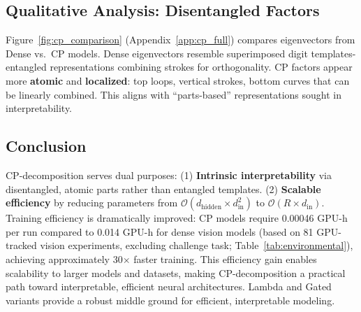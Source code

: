 \subsection{Qualitative Analysis: Disentangled Factors}

Figure~\ref{fig:cp_comparison} (Appendix~\ref{app:cp_full}) compares eigenvectors from Dense vs.\ CP models.
Dense eigenvectors resemble superimposed digit templates-entangled representations combining strokes for orthogonality.
CP factors appear more \textbf{atomic} and \textbf{localized}: top loops, vertical strokes, bottom curves that can be linearly combined.
This aligns with ``parts-based'' representations sought in interpretability.

\subsection{Conclusion}

CP-decomposition serves dual purposes:
(1) \textbf{Intrinsic interpretability} via disentangled, atomic parts rather than entangled templates.
(2) \textbf{Scalable efficiency} by reducing parameters from $\mathcal{O}(d_{\text{hidden}} \times d_{\text{in}}^2)$ to $\mathcal{O}(R \times d_{\text{in}})$.
Training efficiency is dramatically improved: CP models require 0.00046 GPU-h per run compared to 0.014 GPU-h for dense vision models (based on 81 GPU-tracked vision experiments, excluding challenge task; Table~\ref{tab:environmental}), achieving approximately 30$\times$ faster training.
This efficiency gain enables scalability to larger models and datasets, making CP-decomposition a practical path toward interpretable, efficient neural architectures.
Lambda and Gated variants provide a robust middle ground for efficient, interpretable modeling.
